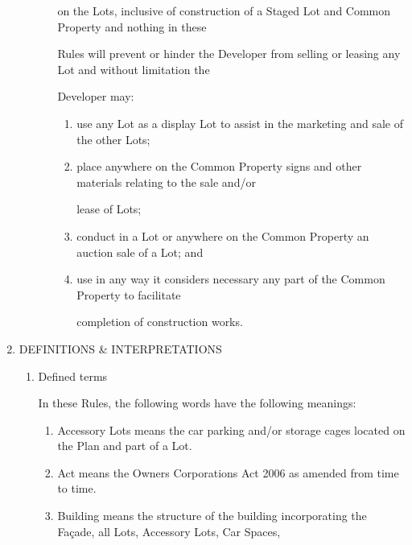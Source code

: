 \documentclass{article}
\begin{document}
\begin{enumerate}[label=\arabic*.]
\begin{enumerate}[label=\arabic{enumi}.\arabic*.]
\begin{enumerate}[label=(\arabic*)]
{\fontsize{10.02}{1}on the Lots, inclusive of construction of a Staged Lot and Common Property and nothing in these }

{\fontsize{10.02}{1}Rules will prevent or hinder the Developer from selling or leasing any Lot and without limitation the }

{\fontsize{10.02}{1}Developer may: }

\begin{enumerate}[label=(\alph*)]
\item {\fontsize{9.962}{1} use any Lot as a display Lot to assist in the marketing and sale of the other Lots; }

\item {\fontsize{9.962}{1} place anywhere on the Common Property signs and other materials relating to the sale and/or }

{\fontsize{10.02}{1}lease of Lots; }

\item {\fontsize{9.962}{1} conduct in a Lot or anywhere on the Common Property an auction sale of a Lot; and }

\item {\fontsize{9.962}{1} use in any way it considers necessary any part of the Common Property to facilitate }

{\fontsize{10.02}{1}completion of construction works. }

\end{enumerate}
\end{enumerate}
\end{enumerate}
\item {\fontsize{9.99}{1} DEFINITIONS \& INTERPRETATIONS }

\begin{enumerate}[label=\arabic{enumi}.\arabic*.]
\item {\fontsize{9.99}{1} Defined terms }

{\fontsize{10.02}{1}In these Rules, the following words have the following meanings: }

\begin{enumerate}[label=(\arabic*)]
\item {\fontsize{9.962}{1} Accessory Lots means the car parking and/or storage cages located on the Plan and part of a Lot. }

\item {\fontsize{9.962}{1} Act means the Owners Corporations Act 2006 as amended from time to time. }

\item {\fontsize{9.962}{1} Building means the structure of the building incorporating the Façade, all Lots, Accessory Lots, Car Spaces, }


\end{enumerate}
\end{enumerate}
\end{enumerate}
\end{document}
